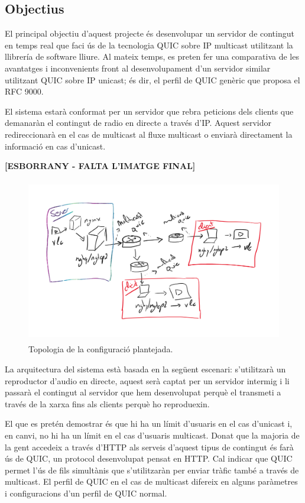 \subsection{Objectius}
{
    El principal objectiu d'aquest projecte és desenvolupar un servidor de contingut en temps real que faci ús de la tecnologia
    QUIC sobre \ac{IP} multicast utilitzant la llibrería de software lliure. Al mateix temps, es preten fer una comparativa de les
    avantatges i inconvenients front al desenvolupament d'un servidor similar utilitzant QUIC sobre IP unicast; és dir, el perfil
    de QUIC genèric que proposa el \ac{RFC} 9000.

    El sistema estarà conformat per un servidor que rebra peticions dels clients que demanaràn el contingut de radio en directe a
    través d'\ac{IP}. Aquest servidor redireccionarà en el cas de multicast al fluxe multicast o enviarà directament la informació en
    cas d'unicast.

    \textbf{[ESBORRANY - FALTA L'IMATGE FINAL]}
    \begin{figure}[H]
        \label{fig:esborrany_configuracio}
        \centering
        \includegraphics[width=15cm, height=7.2cm]{img/01_introduccio/topologia_conf.png}
        \caption[Trafic d'Internet]{\footnotesize{Topologia de la configuració plantejada.}}
    \end{figure}

    La arquitectura del sistema està basada en la següent escenari: s'utilitzarà un reproductor d'audio en directe, aquest serà captat
    per un servidor intermig i li passarà el contingut al servidor que hem desenvolupat perquè el transmeti a través de la xarxa fins als
    clients perquè ho reproduexin.

    El que es pretén demostrar és que hi ha un límit d'usuaris en el cas d'unicast i, en canvi, no hi ha un límit en el cas d'usuaris multicast.
    Donat que la majoria de la gent accedeix a través d'HTTP als serveis d'aquest tipus de contingut és farà ús de QUIC, un protocol desenvolupat
    pensat en HTTP. Cal indicar que QUIC permet l'ús de fils simultànis que s'utilitzaràn per enviar tràfic també a través de multicast. El perfil
    de QUIC en el cas de multicast difereix en alguns paràmetres i configuracions d'un perfil de QUIC normal.
}

